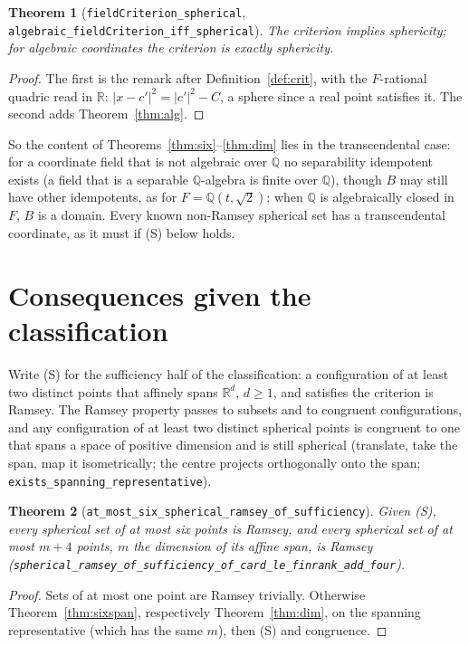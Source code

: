 \documentclass[11pt]{article}
\newtheorem{theorem}{Theorem}
\theoremstyle{definition}
\theoremstyle{remark}
\newcommand{\R}{\mathbb{R}}
\newcommand{\Q}{\mathbb{Q}}
\newcommand{\B}{B}
\begin{document}
\begin{theorem}[\texttt{fieldCriterion\_spherical}, \texttt{algebraic\_fieldCriterion\_iff\_spherical}]
The criterion implies sphericity; for algebraic coordinates the criterion is exactly sphericity.
\end{theorem}

\begin{proof}
The first is the remark after Definition~\ref{def:crit}, with the $F$-rational quadric read in $\R$:
$|x - c'|^2 = |c'|^2 - C$, a sphere since a real point satisfies it. The second adds
Theorem~\ref{thm:alg}.
\end{proof}

So the content of Theorems~\ref{thm:six}--\ref{thm:dim} lies in the transcendental case: for a
coordinate field that is not algebraic over $\Q$ no separability idempotent exists (a field that is a
separable $\Q$-algebra is finite over $\Q$), though $\B$ may still have other idempotents, as for
$F = \Q(t, \sqrt 2)$; when $\Q$ is algebraically closed in $F$, $\B$ is a domain. Every known non-Ramsey
spherical set has a transcendental coordinate, as it must if (S) below holds.

\section{Consequences given the classification}\label{sec:ramsey}

Write (S) for the sufficiency half of the classification: a configuration of at least two distinct
points that affinely spans $\R^d$, $d \geq 1$, and satisfies the criterion is Ramsey. The Ramsey
property passes to subsets and to congruent configurations, and any configuration of at least two
distinct spherical points is congruent to one that spans a space of positive dimension and is still
spherical (translate, take the span, map it isometrically; the centre projects orthogonally onto the
span; \texttt{exists\_spanning\_representative}).

\begin{theorem}[\texttt{at\_most\_six\_spherical\_ramsey\_of\_sufficiency}]\label{thm:ramsey6}
Given \emph{(S)}, every spherical set of at most six points is Ramsey, and every spherical set of at
most $m + 4$ points, $m$ the dimension of its affine span, is Ramsey
(\texttt{spherical\_ramsey\_of\_}\allowbreak\texttt{sufficiency\_of\_card\_le\_finrank\_add\_four}).
\end{theorem}

\begin{proof}
Sets of at most one point are Ramsey trivially. Otherwise Theorem~\ref{thm:sixspan}, respectively
Theorem~\ref{thm:dim}, on the spanning representative (which has the same $m$), then (S) and congruence.
\end{proof}
\end{document}
